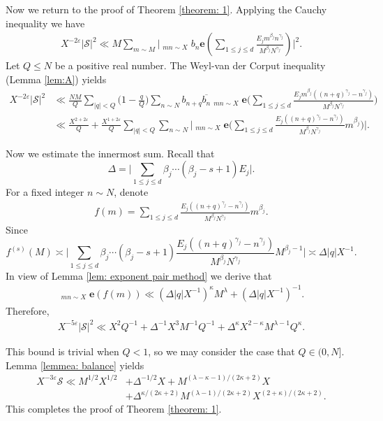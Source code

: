 \documentclass[12pt, reqno, twoside, letterpaper]{amsart}
\numberwithin{equation}{section}
\newcommand{\cS}{\ensuremath{\mathcal{S}}}
\theoremstyle{customthm}
\theoremstyle{customrem}
\begin{document}
Now we return to the proof of Theorem \ref{theorem: 1}.
Applying the Cauchy inequality we have
\begin{align*}
X^{-2\varepsilon}|\cS|^2\ll M\sum_{m\sim M}\Bigg|\mathop{\sum_{n\sim N}}_{mn\sim X}b_n
\mathbf{e}\left(\sum_{1\leqslant j\leqslant d}
\frac{E_jm^{\beta_j}n^{\gamma_j}}{M^{\beta_j}N^{\gamma_j}}\right)\Bigg|^2.
\end{align*}
Let $Q\leqslant N$ be a positive real number. The Weyl-van der Corput inequality
(Lemma \ref{lem:A}) yields
\begin{align*}
X^{-2\varepsilon}|\cS|^2&\ll \frac{NM}{Q}\sum_{|q|<Q}\Big(1-\frac{q}{Q}\Big)
\sum_{n\sim N}b_{n+q}\overline{b_n}\mathop{\sum_{m\sim M}}_{mn\sim X}
\mathbf{e}\Bigg(\sum_{1\leqslant j\leqslant d}\frac{E_jm^{\beta_j}((n+q)^{\gamma_j}-n^{\gamma_j})}
{M^{\beta_j}N^{\gamma_j}}\Bigg)\nonumber\\
&\ll\frac{X^{2+2\varepsilon}}{Q}+\frac{X^{1+2\varepsilon}}{Q}\sum_{|q|<Q}\sum_{n\sim N}
\Bigg|\mathop{\sum_{m\sim M}}_{mn\sim X}
\mathbf{e}\Bigg(\sum_{1\leqslant j\leqslant d}\frac{E_j((n+q)^{\gamma_j}-n^{\gamma_j})}
{M^{\beta_j}N^{\gamma_j}}m^{\beta_j}\Bigg)\Bigg|.
\end{align*}

Now we estimate the innermost sum. Recall that
$$
\Delta=\Bigg|\sum_{1\leqslant j\leqslant d}\beta_j\cdots(\beta_j-s+1)E_j\Bigg|.
$$
For a fixed integer $n\sim N$, denote
\begin{align*}
f(m)=\sum_{1\leqslant j\leqslant d}\frac{E_j((n+q)^{\gamma_j}-n^{\gamma_j})}
{M^{\beta_j}N^{\gamma_j}}m^{\beta_j}.
\end{align*}
Since
$$
f^{(s)}(M)\asymp
\Bigg|\sum_{1\leqslant j\leqslant d}\beta_j\cdots(\beta_j-s+1)
\frac{E_j((n+q)^{\gamma_j}-n^{\gamma_j})}{M^{\beta_j}N^{\gamma_j}}M^{\beta_j-1}\Bigg|
\asymp \Delta|q|X^{-1}.
$$
In view of Lemma \ref{lem: exponent pair method} we derive that
\begin{align*}
\mathop{\sum_{m\sim M}}_{mn\sim X}\mathbf{e}(f(m))
\ll (\Delta|q|X^{-1})^{\kappa}M^{\lambda}+(\Delta|q|X^{-1})^{-1}.
\end{align*}
Therefore,
\begin{align*}
X^{-5\varepsilon}|\cS|^2\ll X^2Q^{-1}+\Delta^{-1}X^3M^{-1}Q^{-1}+
\Delta^{\kappa}X^{2-\kappa}M^{\lambda-1}Q^{\kappa}.
\end{align*}


This bound is trivial when $Q<1$, so we may consider the case that $Q\in(0,N]$.
Lemma \ref{lemmea: balance} yields
\begin{align*}
X^{-3\varepsilon}\cS\ll M^{1/2}X^{1/2}&+\Delta^{-1/2}X
+M^{(\lambda-\kappa-1)/(2\kappa+2)}X\\
&+\Delta^{\kappa/(2\kappa+2)}M^{(\lambda-1)/(2\kappa+2)}X^{(2+\kappa)/(2\kappa+2)}.
\end{align*}
This completes the proof of Theorem \ref{theorem: 1}.
\end{document}
